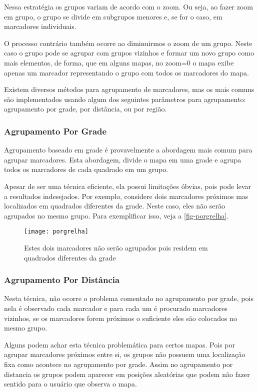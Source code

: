   Nessa estratégia os grupos variam de acordo com o zoom. Ou seja, ao fazer zoom em grupo, o grupo se divide em subgrupos menores e, se for o caso, em marcadores individuais.
  
   O processo contrário também ocorre ao diminuirmos o zoom de um grupo. Neste caso o grupo pode se agrupar com grupos vizinhos e formar um novo grupo como mais elementos, de forma, que em alguns mapas, no zoom=0 o mapa exibe apenas um marcador representando o grupo com todos os marcadores do mapa.

   Existem diversos métodos para agrupamento de marcadores, mas os mais comuns são implementados usando algum dos seguintes parâmetros para agrupamento: agrupamento por grade, por distância, ou por região.
     
		\subsubsection{Agrupamento Por Grade}
		Agrupamento baseado em grade é provavelmente a abordagem mais comum para agrupar marcadores. Esta abordagem, divide o mapa em uma grade e agrupa todos os marcadores de cada quadrado em um grupo. 
		
		Apesar de ser uma técnica eficiente, ela possui limitações óbvias, pois pode levar a resultados indesejados. Por exemplo, considere dois marcadores próximos mas localizados em quadrados diferentes da grade. Neste caso, eles não serão agrupados no mesmo grupo. Para exemplificar isso, veja a \autoref{fig-porgrelha}. 

\begin{figure}[htb]
	\caption{\label{fig-porgrelha}Estes dois marcadores não serão agrupados pois residem em quadrados diferentes da grade}
	\begin{center}
	    \texttt{[image: porgrelha]}
	\end{center}
\end{figure}

		\subsubsection{Agrupamento Por Distância}
			Nesta técnica, não ocorre o problema comentado no agrupamento por grade, pois nela é observado cada marcador e para cada um é procurado marcadores vizinhos, se os marcadores forem próximos o suficiente eles são colocados no mesmo grupo.
		
			Alguns podem achar esta técnica problemática para certos mapas. Pois por agrupar marcadores próximos entre si, os grupos não possuem uma localização fixa como acontece no agrupamento por grade. Assim no agrupamento por distancia os grupos podem aparecer em posições aleatórias que podem não fazer sentido para o usuário que observa o mapa.
	
